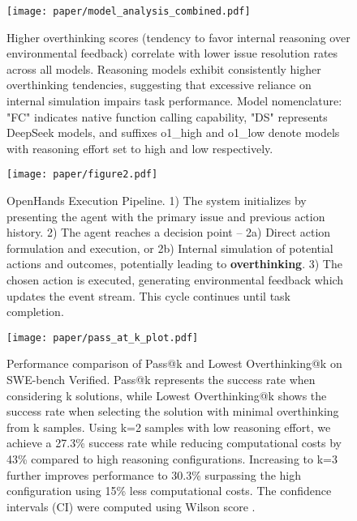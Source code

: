 
\begin{figure}[t]
    \centering
    \texttt{[image: paper/model\_analysis\_combined.pdf]}
    \vspace{-25pt}
\caption{
Higher overthinking scores (tendency to favor internal reasoning over environmental feedback) correlate with lower issue resolution rates across all models. Reasoning models exhibit consistently higher overthinking tendencies, suggesting that excessive reliance on internal simulation impairs task performance. Model nomenclature: "FC" indicates native function calling capability, "DS" represents DeepSeek models, and suffixes o1\_high and o1\_low denote models with reasoning effort set to high and low respectively.
}
    \label{fig:figure1}
\end{figure}

 
\begin{figure}[t]
    \centering
    \texttt{[image: paper/figure2.pdf]}
\caption{OpenHands Execution Pipeline. 1) The system initializes by presenting the agent with the primary issue and previous action history. 2) The agent reaches a decision point -- 2a) Direct action formulation and execution, or 2b) Internal simulation of potential actions and outcomes, potentially leading to \textbf{overthinking}. 3) The chosen action is executed, generating environmental feedback which updates the event stream. This cycle continues until task completion.}
    \label{fig:figure3}
\end{figure}

\begin{figure}[t]
    \centering
    \texttt{[image: paper/pass\_at\_k\_plot.pdf]}
    \vspace{-25pt}
    \caption{
Performance comparison of Pass@k and Lowest Overthinking@k on SWE-bench Verified. Pass@k represents the success rate when considering k solutions, while Lowest Overthinking@k shows the success rate when selecting the solution with minimal overthinking from k samples. Using k=2 samples with low reasoning effort, we achieve a 27.3\% success rate while reducing computational costs by 43\% compared to high reasoning configurations. Increasing to k=3 further improves performance to 30.3\% surpassing the high configuration using 15\% less computational costs. The confidence intervals (CI) were computed using Wilson score \cite{wallis2013binomial}.}
    \label{fig:figure2}
\end{figure}

